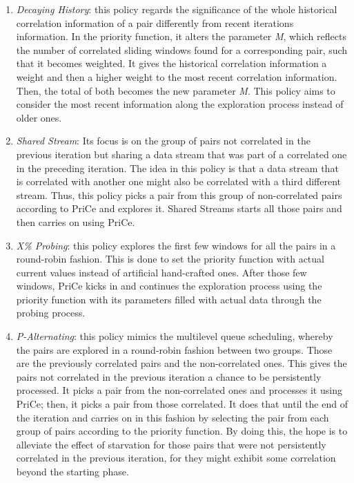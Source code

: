 \begin{enumerate}
\item \textit{Decaying History}: this policy regards the significance of the whole historical correlation information of a pair differently from recent iterations information. In the priority function, it alters the parameter \textit{M}, which reflects the number of correlated sliding windows found for a corresponding pair, such that it becomes weighted. It gives the historical correlation information a weight and then a higher weight to the most recent correlation information. Then, the total of both becomes the new parameter \textit{M}. This policy aims to consider the most recent information along the exploration process instead of older ones.
\item \textit{Shared Stream}: Its focus is on the group of pairs not correlated in the previous iteration but sharing a data stream that was part of a correlated one in the preceding iteration. The idea in this policy is that a data stream that is correlated with another one might also be correlated with a third different stream. Thus, this policy picks a pair from this group of non-correlated pairs according to PriCe and explores it. Shared Streams starts all those pairs and then carries on using PriCe.
\item \textit{X\% Probing}: this policy explores the first few windows for all the pairs in a round-robin fashion. This is done to set the priority function with actual current values instead of artificial hand-crafted ones. After those few windows, PriCe kicks in and continues the exploration process using the priority function with its parameters filled with actual data through the probing process.
\item \textit{P-Alternating}: this policy mimics the multilevel queue scheduling, whereby the pairs are explored in a round-robin fashion between two groups. Those are the previously correlated pairs and the non-correlated ones. This gives the pairs not correlated in the previous iteration a chance to be persistently processed. It picks a pair from the non-correlated ones and processes it using PriCe; then, it picks a pair from those correlated. It does that until the end of the iteration and carries on in this fashion by selecting the pair from each group of pairs according to the priority function. By doing this, the hope is to alleviate the effect of starvation for those pairs that were not persistently correlated in the previous iteration, for they might exhibit some correlation beyond the starting phase.
\end{enumerate}

